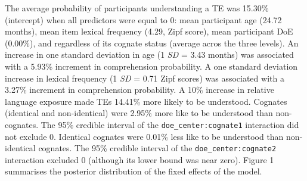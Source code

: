 \documentclass[
  english,
  man,man,floatsintext]{apa6}
\begin{document}
The average probability of participants understanding a TE was 15.30\% (intercept) when all predictors were equal to 0: mean participant age (24.72 months), mean item lexical frequency (4.29, Zipf score), mean participant DoE (0.00\%), and regardless of its cognate status (average acros the three levels). An increase in one standard deviation in age (1 \emph{SD} = 3.43 months) was associated with a 5.93\% increment in comprehension probability. A one standard deviation increase in lexical frequency (1 \emph{SD} = 0.71 Zipf scores) was associated with a 3.27\% increment in comprehension probability. A 10\% increase in relative language exposure made TEs 14.41\% more likely to be understood. Cognates (identical and non-identical) were 2.95\% more like to be understood than non-cognates. The 95\% credible interval of the \texttt{doe\_center:cognate1} interaction did not exclude 0. Identical cognates were 0.01\% less like to be understood than non-identical cognates. The 95\% credible interval of the \texttt{doe\_center:cognate2} interaction excluded 0 (although its lower bound was near zero). Figure 1 summarises the posterior distribution of the fixed effects of the model.
\end{document}

